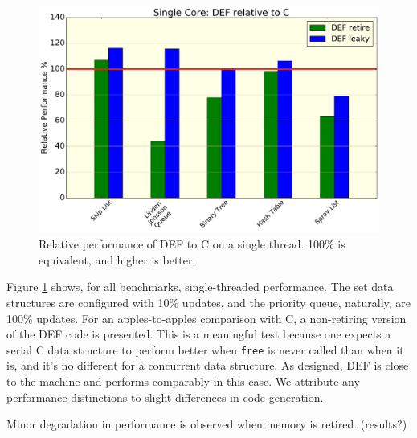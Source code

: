 \begin{figure}[htbp!]
  \centering
  \includegraphics[scale=0.25]{gfx/RelativePerf.pdf}
  \caption{Relative performance of DEF to C on a single thread.  100\% is equivalent, and higher is better.}
  \label{fig:relativeperf}
\end{figure}

Figure \ref{fig:relativeperf} shows, for all benchmarks, single-threaded performance.  The set data structures are configured with 10\% updates, and the priority queue, naturally, are 100\% updates.  For an apples-to-apples comparison with C, a non-retiring version of the DEF code is presented.  This is a meaningful test because one expects a serial C data structure to perform better when \texttt{free} is never called than when it is, and it's no different for a concurrent data structure.  As designed, DEF is close to the machine and performs comparably in this case.  We attribute any performance distinctions to slight differences in code generation.

Minor degradation in performance is observed when memory is retired. (results?)

